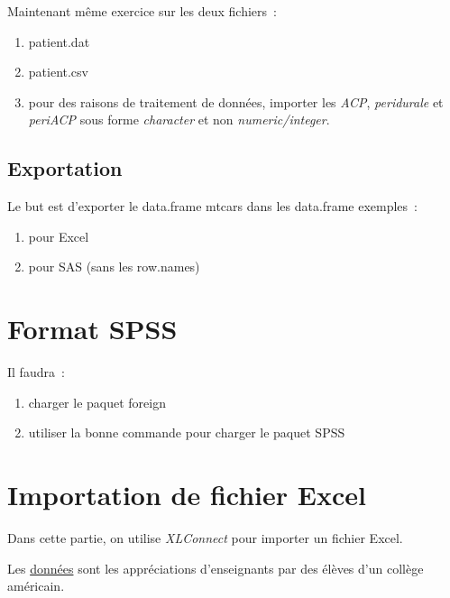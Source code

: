 \documentclass[a4paper,11pt,twoside]{article}\usepackage[]{graphicx}\usepackage[]{color}
\begin{document}
  Maintenant même exercice sur les deux fichiers~:
  \begin{enumerate}
    \item patient.dat



    \item patient.csv
    

    
    
    \item pour des raisons de traitement de données, importer les \emph{ACP},	\emph{peridurale} et   \emph{periACP} sous forme \emph{character} et non \emph{numeric/integer}.



  \end{enumerate}
  
\subsection{Exportation}    

  Le but est d'exporter le data.frame mtcars dans les data.frame exemples~:
  \begin{enumerate}
    \item pour Excel
    

    
    \item pour SAS (sans les row.names)
  


  \end{enumerate}  
  
  
\section{Format SPSS}

  Il faudra~: 
  \begin{enumerate}
    \item charger le paquet foreign
    \item utiliser la bonne commande pour charger le paquet SPSS
  \end{enumerate}



\section{Importation de fichier Excel}

Dans cette partie, on utilise \emph{XLConnect} pour importer un fichier Excel.

Les \href{http://www.inside-r.org/packages/cran/AER/docs/TeachingRatings}{données} sont les appréciations d'enseignants par des élèves d'un collège américain.
\end{document}
